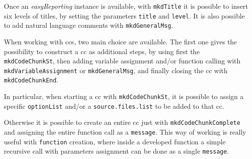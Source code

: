 Once an \textit{easyReporting} instance is available, with \lstinline!mkdTitle! it is possible to insert six levels of titles, by setting the parameters \lstinline!title! and \lstinline!level!.
It is also possible to add natural language comments with \lstinline!mkdGeneralMsg!.

When working with \glspl{cc}, two main choice are available.
The first one gives the possibility to construct a \gls{cc} as additional steps, by using first the \lstinline!mkdCodeChunkSt!, then adding variable assignment and/or function calling with \lstinline!mkdVariableAssignment! or \lstinline!mkdGeneralMsg!, and finally closing the \gls{cc} with \lstinline!mkdCodeChunkEnd!.

In particular, when starting a \gls{cc} with \lstinline!mkdCodeChunkSt!, it is possible to assign a specific \lstinline!optionList! and/or a \lstinline!source.files.list! to be added to that \gls{cc}.

Otherwise it is possible to create an entire \gls{cc} just with \lstinline!mkdCodeChunkComplete! and assigning the entire function call as a \lstinline!message!.
This way of working is really useful with \lstinline!function! creation, where inside a developed function a simple recursive call with parameters assignment can be done as a single \lstinline!message!.




